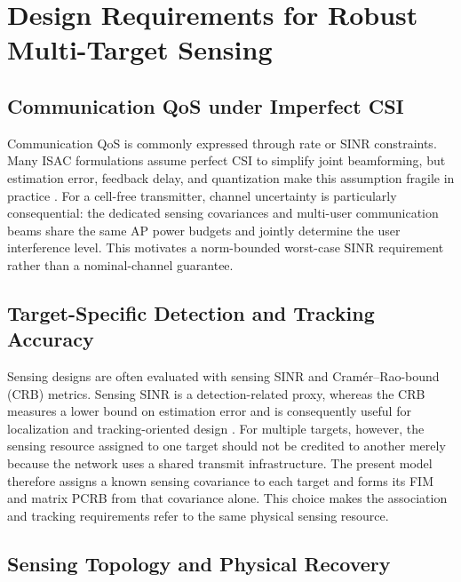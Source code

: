 \section{Design Requirements for Robust Multi-Target Sensing}

\subsection{Communication QoS under Imperfect CSI}

Communication QoS is commonly expressed through rate or SINR constraints.
Many ISAC formulations assume perfect CSI to simplify joint beamforming, but
estimation error, feedback delay, and quantization make this assumption fragile
in practice \autocite{yuLocationSensingBeamforming2022,chuIntegratedSensingCommunication2023}.
\autocite{heMSETrainingISAC2024,gongDigitalTwinCSI2025}
For a cell-free transmitter, channel uncertainty is particularly consequential:
the dedicated sensing covariances and multi-user communication beams share the
same AP power budgets and jointly determine the user interference level.
This motivates a norm-bounded worst-case SINR requirement rather than a
nominal-channel guarantee.

\subsection{Target-Specific Detection and Tracking Accuracy}

Sensing designs are often evaluated with sensing SINR and Cram\'er--Rao-bound
(CRB) metrics. Sensing SINR is a detection-related proxy, whereas the CRB
measures a lower bound on estimation error and is consequently useful for
localization and tracking-oriented design
\autocite{liaoCooperativeBaseStation2025,gengJointBeamformingCRBconstrained2025}.
\autocite{liuCRBBeamforming2022}
For multiple targets, however, the sensing resource assigned to one target
should not be credited to another merely because the network uses a shared
transmit infrastructure. The present model therefore assigns a known sensing
covariance to each target and forms its FIM and matrix PCRB from that covariance
alone. This choice makes the association and tracking requirements refer to
the same physical sensing resource.

\subsection{Sensing Topology and Physical Recovery}

